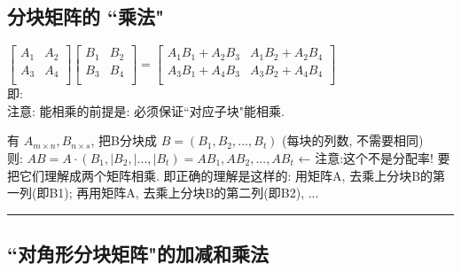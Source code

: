 \documentclass[UTF8]{ctexart}
\begin{document}
\subsection{分块矩阵的 ``乘法"}

$
\left[ \begin{matrix}
	A_1&		A_2\\
	\hline
	A_3&		A_4\\
\end{matrix} \right] \left[ \begin{array}{c|c}
	B_1&		B_2\\
	B_3&		B_4\\
\end{array} \right] 
=\left[ \begin{matrix}
	A_1B_1+A_2B_3&		A_1B_2+A_2B_4\\
	A_3B_1+A_4B_3&		A_3B_2+A_4B_4\\
\end{matrix} \right] 
$\\

即: \\


注意: 能相乘的前提是: 必须保证``对应子块"能相乘. \\


\begin{myEnvSample}
有 $A_{m×n}, B_{n×s}$, 把B分块成 $B=\left( B_1,B_2,...,B_t \right) $ (每块的列数, 不需要相同) \\
则: $AB=A\cdot \left( B_1,| B_2, | ...,| B_t \right) =AB_1,AB_2,...,AB_t$  ← 注意:这个不是分配率! 要把它们理解成两个矩阵相乘. 即正确的理解是这样的: 用矩阵A, 去乘上分块B的第一列(即B1); 再用矩阵A, 去乘上分块B的第二列(即B2), ... 
\end{myEnvSample}

\hrule

\subsection{``对角形分块矩阵"的加减和乘法 }
\end{document}
